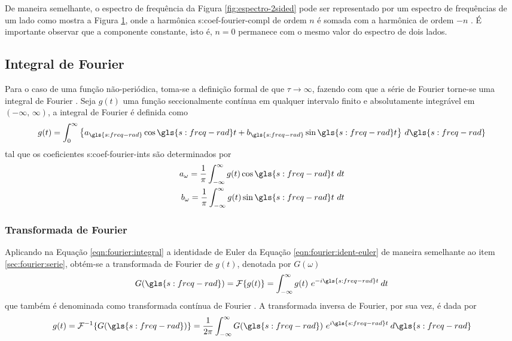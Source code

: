 \documentclass[12pt,oneside,english,brazil,lmodern,siglas,simbolos,cite=num]{ucsmonograph}
\begin{document}
	De maneira semelhante, o espectro de frequência da Figura \ref{fig:espectro-2sided} pode ser representado por um espectro de frequências de um lado como mostra a Figura \ref{fig:espectro-1sided}, onde a harmônica \gls{s:coef-fourier-compl} de ordem $ n $ é somada com a harmônica de ordem $ -n $ \cite{randall:1987}.
	É importante observar que a componente constante, isto é, $ n=0 $ permanece com o mesmo valor do espectro de dois lados.
	\begin{figure}[t]
		\label{fig:espectro-1sided}
	\end{figure}
	
	\subsection{Integral de Fourier}
	Para o caso de uma função não-periódica, toma-se a definição formal de que $ \tau\to\infty $, fazendo com que a série de Fourier torne-se uma integral de Fourier \cite{spiegel:1977}.
	Seja $g(t)$ uma função seccionalmente contínua em qualquer intervalo finito e absolutamente integrável em $ (-\infty ,\,\infty) $, a integral de Fourier é definida como \cite{spiegel:1977}
	\begin{equation}\label{eqn:fourier:integral}
		g(t) = \int_{0}^{\infty}\left\lbrace a_{\gls{s:freq-rad}}\cos\gls{s:freq-rad} t + b_{\gls{s:freq-rad}}\sin\gls{s:freq-rad} t\right\rbrace\, d\gls{s:freq-rad}
	\end{equation}
	tal que os coeficientes \glspl{s:coef-fourier-int} são determinados por
	\setlength{}
	\begin{align}
		a_\omega = \frac{1}{\pi}\int_{-\infty}^{\infty}g(t)\cos\gls{s:freq-rad} t\ dt \\
		b_\omega = \frac{1}{\pi}\int_{-\infty}^{\infty}g(t)\sin\gls{s:freq-rad} t\ dt
	\end{align}
	
	\subsubsection{Transformada de Fourier} \label{sec:fourier:transform}
	Aplicando na Equação \ref{eqn:fourier:integral} a identidade de Euler da Equação \ref{eqn:fourier:ident-euler} de maneira semelhante ao item \ref{sec:fourier:serie}, obtém-se a transformada de Fourier \cite{savi:2017} de $g(t)$, denotada por $G(\omega)$
	\begin{equation} \label{eqn:fourier:transform}
		G(\gls{s:freq-rad}) = \mathcal{F}\{g(t)\} = \int_{-\infty}^{\infty}g(t)\ e^{-i\gls{s:freq-rad} t}\:dt
	\end{equation}
	que também é denominada como transformada contínua de Fourier \cite{dimarogonas:1995}.
	A transformada inversa de Fourier, por sua vez, é dada por \cite{spiegel:1977}
	\begin{equation} \label{eqn:fourier:transform-inv}
		g(t) = \mathcal{F}^{-1}\{G(\gls{s:freq-rad})\} = \frac{1}{2\pi}\int_{-\infty}^{\infty}G(\gls{s:freq-rad})\ e^{i\gls{s:freq-rad} t}\:d\gls{s:freq-rad}
	\end{equation}
	
\end{document}

